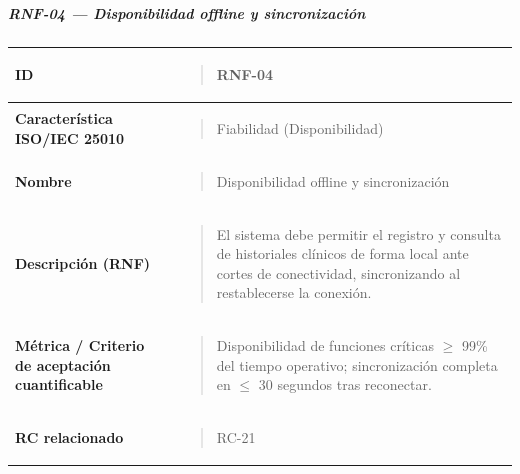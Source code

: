 \documentclass[
]{article}
\newcounter{none} %
\begin{document}
\subparagraph{RNF-04 --- Disponibilidad offline y
sincronización}\label{rnf-04-disponibilidad-offline-y-sincronizacion}

{\def\LTcaptype{none} %
\begin{longtable}[]{@{}
  >{\raggedright\arraybackslash}p{}
  >{\raggedright\arraybackslash}p{}@{}}
\toprule\noalign{}
\begin{minipage}[b]{\linewidth}\raggedright
\textbf{ID}
\end{minipage} & \begin{minipage}[b]{\linewidth}\raggedright
\begin{quote}
RNF-04
\end{quote}
\end{minipage} \\
\midrule\noalign{}
\endhead
\bottomrule\noalign{}
\endlastfoot
\textbf{Característica ISO/IEC 25010} & \begin{minipage}[t]{\linewidth}\raggedright
\begin{quote}
Fiabilidad (Disponibilidad)
\end{quote}
\end{minipage} \\
\textbf{Nombre} & \begin{minipage}[t]{\linewidth}\raggedright
\begin{quote}
Disponibilidad offline y sincronización
\end{quote}
\end{minipage} \\
\textbf{Descripción (RNF)} & \begin{minipage}[t]{\linewidth}\raggedright
\begin{quote}
El sistema debe permitir el registro y consulta de historiales clínicos
de forma local ante cortes de conectividad, sincronizando al
restablecerse la conexión.
\end{quote}
\end{minipage} \\
\textbf{Métrica / Criterio de aceptación cuantificable} & \begin{minipage}[t]{\linewidth}\raggedright
\begin{quote}
Disponibilidad de funciones críticas \(\geq\) 99\% del tiempo
operativo; sincronización completa en \(\leq\) 30 segundos tras
reconectar.
\end{quote}
\end{minipage} \\
\textbf{RC relacionado} & \begin{minipage}[t]{\linewidth}\raggedright
\begin{quote}
RC-21
\end{quote}
\end{minipage} \\
\end{longtable}
}
\end{document}

